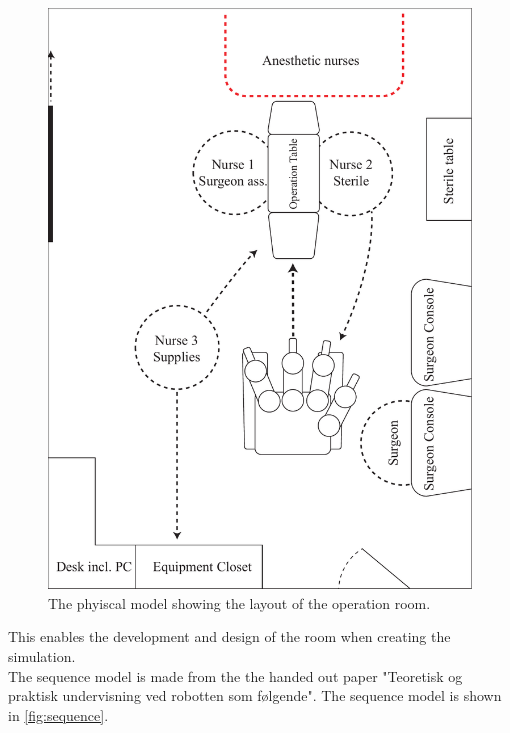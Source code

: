 \documentclass[paper=a4, fontsize=11pt]{scrartcl} %
\numberwithin{equation}{section} %
\numberwithin{figure}{section} %
\numberwithin{table}{section} %
\begin{document}
\begin{figure}[hpbt]
	\centering
	\includegraphics[width=\textwidth]{physical}
	\caption{The phyiscal model showing the layout of the operation room.}
	\label{fig:layout}
\end{figure}

This enables the development and design of the room when creating the simulation.\\

The sequence model is made from the the handed out paper "Teoretisk og praktisk undervisning ved robotten som følgende". The sequence model is shown in \autoref{fig:sequence}.
\end{document}
